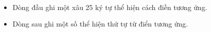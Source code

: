  
\begin{itemize}
	\item Dòng đầu ghi một xâu 25 ký tự thể hiện cách điền tương ứng.
	\item Dòng sau ghi một số thể hiện thứ tự từ điển tương ứng.
\end{itemize}